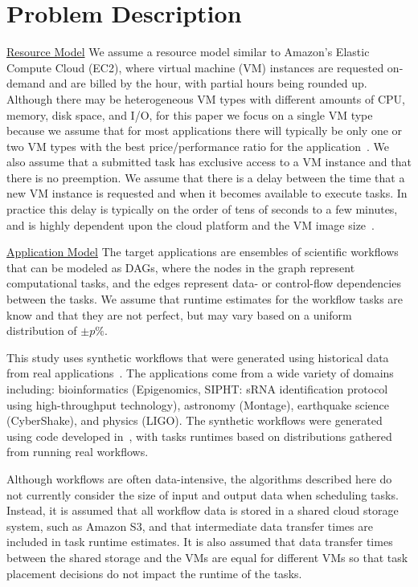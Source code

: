 \documentclass[conference]{IEEEtran}
\begin{document}
 
\section{Problem Description}
\label{sec:problem}

\underline{Resource Model}  We assume a resource model similar to Amazon's Elastic Compute Cloud (EC2),
where virtual machine (VM) instances are requested on-demand and are billed by
the hour, with partial hours being rounded up. Although there may be
heterogeneous VM types with different amounts of CPU, memory, disk space, and
I/O, for this paper we focus on a single VM type because we assume that for most
applications there will typically be only one or two VM types with the best
price/performance ratio for the application~\cite{Juve2009}. We also assume that
a submitted task has exclusive access to a VM instance and that there is no
preemption. We assume that there is a delay between the time that a new VM
instance is requested and when it becomes available to execute tasks. In
practice this delay is typically on the order of tens of seconds to a few
minutes, and is highly dependent upon the cloud platform and the VM image
size~\cite{Nurmi2008b}.



\underline{Application Model} The target applications are ensembles of scientific workflows that can be
modeled as DAGs, where the nodes in the graph
represent computational tasks, and the edges represent data- or control-flow
dependencies between the tasks. We assume that runtime estimates for the workflow tasks
 are know and  that they are not perfect, but may
vary based on a uniform distribution of $\pm p\%$.


This study uses synthetic workflows that were generated using historical data
from real applications~\cite{Bharathi2008}. The applications come from a wide
variety of domains including: bioinformatics (Epigenomics, SIPHT: sRNA
identification protocol using high-throughput technology), astronomy (Montage),
earthquake science (CyberShake), and physics (LIGO).  The synthetic workflows were generated using code
developed in~\cite{WorkflowGenerator},  with tasks runtimes based on distributions gathered from
running real workflows.


Although workflows are often data-intensive, the algorithms described
here do not currently consider the size of input and output data
when scheduling tasks. Instead, it is assumed that all workflow data is stored in
a shared cloud storage system, such as Amazon S3, and that intermediate data
transfer times are included in task runtime estimates. It is also assumed that
data transfer times between the shared storage and the VMs are equal for
different VMs so that task placement decisions do not impact the
runtime of the tasks.
\end{document}
